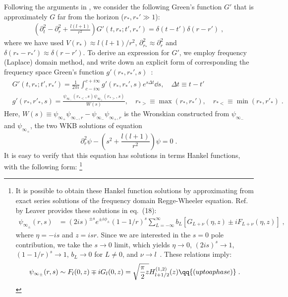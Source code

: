 Following the arguments in , we consider the following Green's function $G'$ that is approximately $G$ far from the horizon ($r_*, r_*' \gg 1$):
\begin{align}
  \left( \partial_t^2 - \partial_r^2 + \frac{l(l+1)}{r^2} \right) G'(t,r_*;t',r_*') =  \delta(t-t') \delta(r-r')  \;,
\end{align}
where we have used $V(r_*) \approx l(l+1)/r^2$, $\partial_{r_*}^2 \approx \partial_r^2$ and $\delta(r_*-r_*') \approx \delta(r-r')$.
To derive an expression for $G'$, we employ frequency (Laplace) domain method, and write down an explicit form of corresponding the frequency space Green's function $g'(r_*,r_*',s)$~\cite{Leaver:1986gd}:
\begin{align}\label{eq:G_prime_frequency_domain}
  &G'(t,r_*;t',r_*') = \frac{1}{2\pi i} \int_{c - i\infty}^{c + i\infty} g'(r_*, r_*',s) e^{s \Delta t} \dd{s},\quad  \Delta t \equiv t - t' \nonumber \\
  &g'(r_*, r'_*, s) = \frac{\psi_{\infty_-}(r_{*<}, s) \psi_{\infty_+}(r_{*>}, s)}{W(s)}, \quad    r_{*>} \equiv \max(r_*, r_*'), \quad r_{*<} \equiv \min(r_*, r'_*) \;.
\end{align}
Here, \( W(s) \equiv \psi_{\infty_+} \psi_{\infty_-,r} - \psi_{\infty_-} \psi_{\infty_+,r}\) is the Wronskian constructed from $\psi_{\infty_-}$ and $\psi_{\infty_+}$, the two WKB solutions of equation
\begin{equation}
  \partial_{r}^2 \psi - \left(s^2 + \frac{l(l+1)}{r^2}\right) \psi = 0 \;.
\end{equation}
It is easy to verify that this equation has solutions in terms Hankel functions, with the following form:
\footnote{It is possible to obtain these Hankel function solutions by approximating from exact series solutions of the frequency domain Regge-Wheeler equation. 
  Ref.~\cite{Leaver:1986gd} by Leaver provides these solutions in eq.~(18):
  \begin{align}
    \psi_{\infty_\pm}(r, s) &= (2is)^{\pm s} e^{\pm i \phi_\pm} (1 - 1/r)^s \sum_{L=-\infty}^{\infty} b_L [G_{L+\nu}(\eta,z) \pm i F_{L+\nu}(\eta,z)] \;,
  \end{align}
  where $\eta = -is$ and $z = i s r$.
  Since we are interested in the $s = 0$ pole contribution, we take the $s\to 0$ limit, which yields $\eta \to 0$, $(2is)^s \to 1$, $(1-1/r)^s \to 1$, $b_L \to 0$ for $L \neq 0$, and $\nu \to l$~\cite{Leaver:1986gd,Leaver:1986vnb}.
  These relations imply:
  \begin{align}
    \psi_{\infty_\pm}(r, s) \sim F_{l}(0,z) \mp i G_{l}(0,z) = \sqrt{\frac{\pi}{2} z} H_{l+1/2}^{(1,2)}(z)
    \qq{(up to a phase)} \;.
  \end{align}
}
